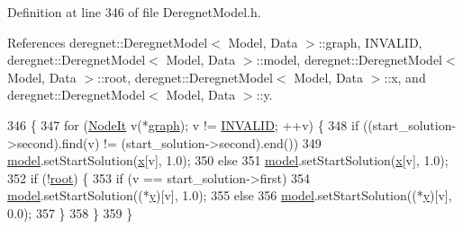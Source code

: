Definition at line 346 of file Deregnet\+Model.\+h.



References deregnet\+::\+Deregnet\+Model$<$ Model, Data $>$\+::graph, I\+N\+V\+A\+L\+ID, deregnet\+::\+Deregnet\+Model$<$ Model, Data $>$\+::model, deregnet\+::\+Deregnet\+Model$<$ Model, Data $>$\+::root, deregnet\+::\+Deregnet\+Model$<$ Model, Data $>$\+::x, and deregnet\+::\+Deregnet\+Model$<$ Model, Data $>$\+::y.


\begin{DoxyCode}
346                                                                                                            
      \{
347     \textcolor{keywordflow}{for} (\hyperlink{namespacederegnet_ac34314e1b5f456fc6d1bb9d96316de4a}{NodeIt} v(*\hyperlink{classderegnet_1_1DeregnetModel_a3cd2f54b8e061ef5bed32708d9bc1ef1}{graph}); v != \hyperlink{usinglemon_8h_adf770fe2eec438e3758ffe905dbae208}{INVALID}; ++v) \{
348         \textcolor{keywordflow}{if} ((start\_solution->second).find(v) != (start\_solution->second).end())
349             \hyperlink{classderegnet_1_1DeregnetModel_a30d525de2086e342b33fe3e45ede4947}{model}.setStartSolution(\hyperlink{classderegnet_1_1DeregnetModel_a360c980f3fec4dfbab50e9bb06a933a8}{x}[v], 1.0);
350         \textcolor{keywordflow}{else}
351             \hyperlink{classderegnet_1_1DeregnetModel_a30d525de2086e342b33fe3e45ede4947}{model}.setStartSolution(\hyperlink{classderegnet_1_1DeregnetModel_a360c980f3fec4dfbab50e9bb06a933a8}{x}[v], 1.0);
352         \textcolor{keywordflow}{if} (!\hyperlink{classderegnet_1_1DeregnetModel_a54b20393a0e26d65935d387685d7fe96}{root}) \{
353             \textcolor{keywordflow}{if} (v == start\_solution->first)
354                 \hyperlink{classderegnet_1_1DeregnetModel_a30d525de2086e342b33fe3e45ede4947}{model}.setStartSolution((*\hyperlink{classderegnet_1_1DeregnetModel_ae76df61afe302b939165facf3dd21ac8}{y})[v], 1.0);
355             \textcolor{keywordflow}{else}
356                 \hyperlink{classderegnet_1_1DeregnetModel_a30d525de2086e342b33fe3e45ede4947}{model}.setStartSolution((*\hyperlink{classderegnet_1_1DeregnetModel_ae76df61afe302b939165facf3dd21ac8}{y})[v], 0.0);
357         \}
358     \}
359 \}
\end{DoxyCode}
